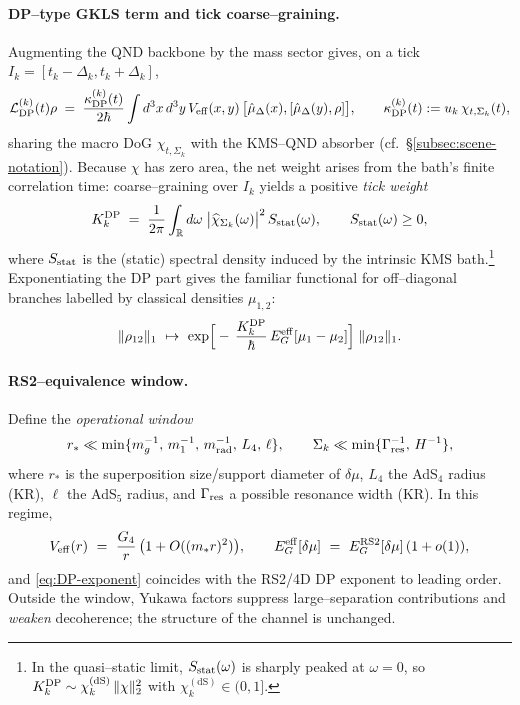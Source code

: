 \documentclass[10pt]{article}
\theoremstyle{definition}
\theoremstyle{plain}
\begin{document}
\paragraph{DP–type GKLS term and tick coarse--graining.}\label{par:uom-main-226}
Augmenting the QND backbone by the mass sector gives, on a tick \(I_k=[t_k-\Delta_k,t_k+\Delta_k]\),
\begin{equation}
\mathcal L_{\rm DP}^{(k)}(t)\rho\;=\;\frac{\kappa_{\rm DP}^{(k)}(t)}{2\hbar}\int d^3x\,d^3y\,
V_{\rm eff}(x,y)\,\big[\hat\mu_\Delta(x),[\hat\mu_\Delta(y),\rho]\big],
\qquad \kappa_{\rm DP}^{(k)}(t):=u_k\,\chi_{t,\Sigma_k}(t),
\label{eq:DP-local}
\end{equation}
sharing the macro DoG \(\chi_{t,\Sigma_k}\) with the KMS--QND absorber (cf.\ \S\ref{subsec:scene-notation}). Because \(\chi\) has zero area, the net weight arises from the bath’s finite correlation time: coarse--graining over \(I_k\) yields a positive \emph{tick weight}
\begin{equation}
K_k^{\rm DP}\;=\;\frac{1}{2\pi}\int_{\mathbb R} d\omega\;\big|\widehat{\chi}_{\Sigma_k}(\omega)\big|^2\,S_{\rm stat}(\omega),
\qquad S_{\rm stat}(\omega)\ge0,
\label{eq:DP-weight}
\end{equation}
where \(S_{\rm stat}\) is the (static) spectral density induced by the intrinsic KMS bath.\footnote{In the quasi–static limit, \(S_{\rm stat}(\omega)\) is sharply peaked at \(\omega\!=\!0\), so \(K_k^{\rm DP}\sim \chi_k^{(\mathrm{dS})}\,\|\chi\|_2^2\) with \(\chi_k^{(\mathrm{dS})}\in(0,1]\).}
Exponentiating the DP part gives the familiar functional for off--diagonal branches labelled by classical densities \(\mu_{1,2}\):
\begin{equation}
\|\rho_{12}\|_1\ \mapsto\ \exp\!\Big[-\,\frac{K_k^{\rm DP}}{\hbar}\,E_G^{\rm eff}[\mu_1-\mu_2]\Big]\;\|\rho_{12}\|_1.
\label{eq:DP-exponent}
\end{equation}

\paragraph{RS2--equivalence window.}\label{par:uom-main-227}
Define the \emph{operational window}
\[
r_\ast\ll \min\{m_g^{-1},\,m_1^{-1},\,m_{\rm rad}^{-1},\,L_4,\,\ell\},\qquad
\Sigma_k\ll \min\{\Gamma_{\rm res}^{-1},\,H^{-1}\},
\]
where \(r_\ast\) is the superposition size/support diameter of \(\delta\mu\), \(L_4\) the AdS\(_4\) radius (KR), \(\ell\) the AdS\(_5\) radius, and \(\Gamma_{\rm res}\) a possible resonance width (KR). In this regime,
\begin{equation}
V_{\rm eff}(r)\ =\ \frac{G_4}{r}\,\big(1+O((m_\ast r)^2)\big),\qquad
E_G^{\rm eff}[\delta\mu]\ =\ E_G^{\rm RS2}[\delta\mu]\,(1+o(1)),
\label{eq:RS2-window}
\end{equation}
and \eqref{eq:DP-exponent} coincides with the RS2/4D DP exponent to leading order. Outside the window, Yukawa factors suppress large--separation contributions and \emph{weaken} decoherence; the structure of the channel is unchanged.
\end{document}
